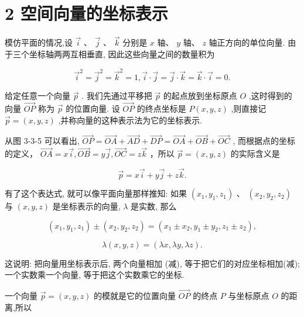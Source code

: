 \documentclass[10pt]{article}
\begin{document}
\section*{2 空间向量的坐标表示}

模仿平面的情况,设 \(\overrightarrow{i}\text{ 、 }\overrightarrow{j}\text{ 、 }\overrightarrow{k}\) 分别是 \(x\) 轴、 \(y\) 轴、 \(z\) 轴正方向的单位向量. 由于三个坐标轴两两互相垂直, 因此这些向量之间的数量积为

\[
{\overrightarrow{i}}^{2} = {\overrightarrow{j}}^{2} = {\overrightarrow{k}}^{2} = 1,\overrightarrow{i} \cdot  \overrightarrow{j} = \overrightarrow{j} \cdot  \overrightarrow{k} = \overrightarrow{k} \cdot  \overrightarrow{i} = 0.
\]

给定任意一个向量 \(\overrightarrow{p}\) . 我们先通过平移把 \(\overrightarrow{p}\) 的起点放到坐标原点 \(O\) ,这时得到的向量 \(\overrightarrow{OP}\) 称为 \(\overrightarrow{p}\) 的位置向量. 设 \(\overrightarrow{OP}\) 的终点坐标是 \(P\left( {x,y,z}\right)\) ,则直接记 \(\overrightarrow{p} = \left( {x,y,z}\right)\) ,并称向量的这种表示法为它的坐标表示.

从图 3-3-5 可以看出, \(\overrightarrow{OP} = \overrightarrow{OA} + \overrightarrow{AD} + \overrightarrow{DP} = \overrightarrow{OA} + \overrightarrow{OB} + \overrightarrow{OC}\) , 而根据点的坐标的定义， \(\overrightarrow{OA} = x\overrightarrow{i},\overrightarrow{OB} = y\overrightarrow{j},\overrightarrow{OC} = z\overrightarrow{k}\) ，所以 \(\overrightarrow{p} = \left( {x,y,z}\right)\) 的实际含义是

\[
\overrightarrow{p} = x\overrightarrow{i} + y\overrightarrow{j} + z\overrightarrow{k}.
\]

有了这个表达式, 就可以像平面向量那样推知: 如果 \(\left( {{x}_{1},{y}_{1},{z}_{1}}\right) \text{ 、 }\left( {{x}_{2},{y}_{2},{z}_{2}}\right)\) 与 \(\left( {x,y,z}\right)\) 是坐标表示的向量, \(\lambda\) 是实数, 那么

\[
\left( {{x}_{1},{y}_{1},{z}_{1}}\right)  \pm  \left( {{x}_{2},{y}_{2},{z}_{2}}\right)  = \left( {{x}_{1} \pm  {x}_{2},{y}_{1} \pm  {y}_{2},{z}_{1} \pm  {z}_{2}}\right) ,
\]

\[
\lambda \left( {x,y,z}\right)  = \left( {{\lambda x},{\lambda y},{\lambda z}}\right) .
\]

这说明: 把向量用坐标表示后, 两个向量相加 (减), 等于把它们的对应坐标相加(减); 一个实数乘一个向量, 等于把这个实数乘它的坐标.

一个向量 \(\overrightarrow{p} = \left( {x,y,z}\right)\) 的模就是它的位置向量 \(\overrightarrow{OP}\) 的终点 \(P\) 与坐标原点 \(O\) 的距离,所以
\end{document}
